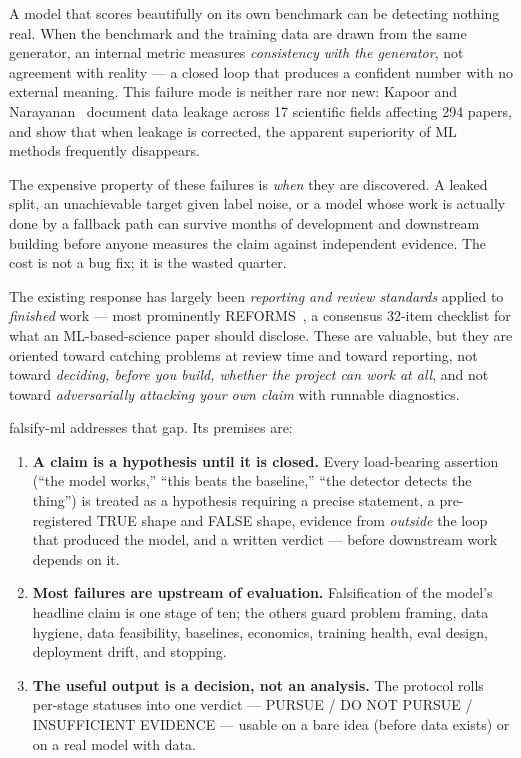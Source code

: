\documentclass[11pt]{article}
\begin{document}
A model that scores beautifully on its own benchmark can be detecting nothing real. When the
benchmark and the training data are drawn from the same generator, an internal metric measures
\emph{consistency with the generator}, not agreement with reality --- a closed loop that produces a
confident number with no external meaning. This failure mode is neither rare nor new: Kapoor and
Narayanan~\cite{kapoor2023leakage} document data leakage across 17 scientific fields affecting 294
papers, and show that when leakage is corrected, the apparent superiority of ML methods frequently
disappears.

The expensive property of these failures is \emph{when} they are discovered. A leaked split, an
unachievable target given label noise, or a model whose work is actually done by a fallback path can
survive months of development and downstream building before anyone measures the claim against
independent evidence. The cost is not a bug fix; it is the wasted quarter.

The existing response has largely been \emph{reporting and review standards} applied to
\emph{finished} work --- most prominently REFORMS~\cite{kapoor2024reforms}, a consensus 32-item
checklist for what an ML-based-science paper should disclose. These are valuable, but they are
oriented toward catching problems at review time and toward reporting, not toward \emph{deciding,
before you build, whether the project can work at all}, and not toward \emph{adversarially attacking
your own claim} with runnable diagnostics.

falsify-ml addresses that gap. Its premises are:

\begin{enumerate}[leftmargin=*]
\item \textbf{A claim is a hypothesis until it is closed.} Every load-bearing assertion (``the model
works,'' ``this beats the baseline,'' ``the detector detects the thing'') is treated as a hypothesis
requiring a precise statement, a pre-registered TRUE shape and FALSE shape, evidence from
\emph{outside} the loop that produced the model, and a written verdict --- before downstream work
depends on it.
\item \textbf{Most failures are upstream of evaluation.} Falsification of the model's headline claim
is one stage of ten; the others guard problem framing, data hygiene, data feasibility, baselines,
economics, training health, eval design, deployment drift, and stopping.
\item \textbf{The useful output is a decision, not an analysis.} The protocol rolls per-stage statuses
into one verdict --- PURSUE / DO NOT PURSUE / INSUFFICIENT EVIDENCE --- usable on a bare idea (before
data exists) or on a real model with data.
\end{enumerate}
\end{document}
